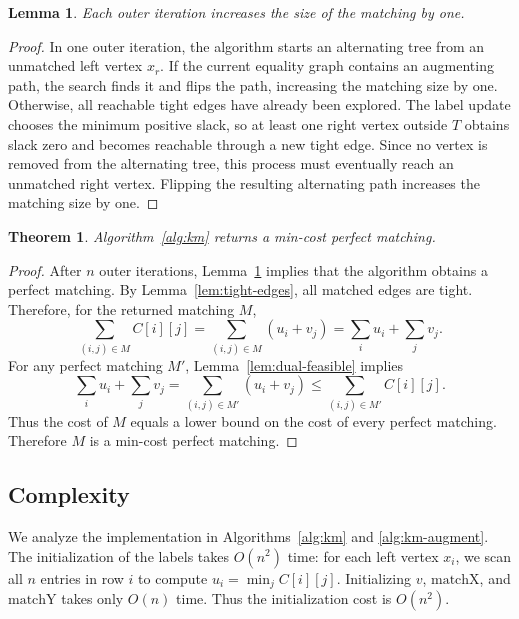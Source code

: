 \documentclass[acmsmall,nonacm]{acmart}
\theoremstyle{plain}
\newtheorem{lemma}{Lemma}
\newtheorem{theorem}{Theorem}
\theoremstyle{remark}
\begin{document}
\begin{lemma}
\label{lem:augment-size}
Each outer iteration increases the size of the matching by one.
\end{lemma}

\begin{proof}
In one outer iteration, the algorithm starts an alternating tree from an
unmatched left vertex $x_r$. If the current equality graph contains an
augmenting path, the search finds it and flips the path, increasing the matching
size by one. Otherwise, all reachable tight edges have already been explored.
The label update chooses the minimum positive slack, so at least one right
vertex outside $T$ obtains slack zero and becomes reachable through a new tight
edge. Since no vertex is removed from the alternating tree, this process must
eventually reach an unmatched right vertex. Flipping the resulting alternating
path increases the matching size by one.
\end{proof}

\begin{theorem}
\label{thm:km-optimal}
Algorithm~\ref{alg:km} returns a min-cost perfect matching.
\end{theorem}

\begin{proof}
After $n$ outer iterations, Lemma~\ref{lem:augment-size} implies that the
algorithm obtains a perfect matching. By Lemma~\ref{lem:tight-edges}, all
matched edges are tight. Therefore, for the returned matching $M$,
\[
    \sum_{(i,j)\in M} C[i][j]
    =
    \sum_{(i,j)\in M}(u_i+v_j)
    =
    \sum_i u_i+\sum_j v_j.
\]
For any perfect matching $M'$, Lemma~\ref{lem:dual-feasible} implies
\[
    \sum_i u_i+\sum_j v_j
    =
    \sum_{(i,j)\in M'}(u_i+v_j)
    \leq
    \sum_{(i,j)\in M'} C[i][j].
\]
Thus the cost of $M$ equals a lower bound on the cost of every perfect matching.
Therefore $M$ is a min-cost perfect matching.
\end{proof}

\subsection{Complexity}
\label{subsec:complexity}

We analyze the implementation in Algorithms~\ref{alg:km} and
\ref{alg:km-augment}. The initialization of the labels takes $O(n^2)$ time:
for each left vertex $x_i$, we scan all $n$ entries in row $i$ to compute
$u_i=\min_j C[i][j]$. Initializing $v$, $\text{matchX}$, and $\text{matchY}$
takes only $O(n)$ time. Thus the initialization cost is $O(n^2)$.
\end{document}
